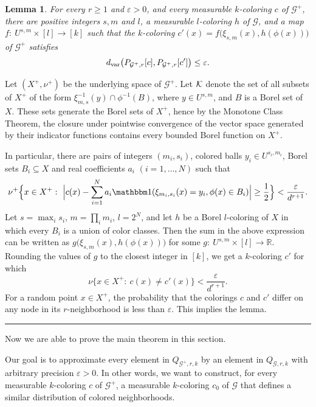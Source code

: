 \documentclass{article}
\newtheorem{lemma}[theorem]{Lemma}
\newenvironment{proof}{{\bf Proof.}}{\hfill\rule{2mm}{2mm}\medskip}
\def\one{{\mathbbm1}}
\def\GG{\mathcal{G}}\def\HH{\mathcal{H}}\def\II{\mathcal{I}}
\def\eps{\varepsilon}
\begin{document}
\begin{lemma}\label{LEM:COLOR-APPROX}
For every $r\ge1$ and $\eps>0$, and every measurable $k$-coloring $c$
of $\GG^+$, there are positive integers $s,m$ and $l$, a measurable
$l$-coloring $h$ of $\GG$, and a map $f:~U^{s,m}\times[l]\to [k]$
such that the $k$-coloring $c'(x)= f\bigl(\xi_{s,m}(x),
h(\phi(x))\big)$ of $\GG^+$ satisfies
\[
d_{\rm var}\bigl(P_{\GG^+,r}[c],P_{\GG^+,r}[c']\bigr) \le \eps.
\]
\end{lemma}
%
\begin{proof}
Let $(X^+,\nu^+)$ be the underlying space of $\GG^+$. Let $\mathcal{K}$
denote the set of all subsets of $X^+$ of the form
$\xi_{m,s}^{-1}(y)\cap \phi^{-1}(B)$, where $y\in U^{s,m}$, and $B$
is a Borel set of $X$. These sets generate the Borel sets of $X^+$,
hence by the Monotone Class Theorem, the closure under pointwise
convergence of the vector space generated by their indicator
functions contains every bounded Borel function on $X^+$.

In particular, there are pairs of integers $(m_i,s_i)$, colored balls
$y_i\in U^{s_i,m_i}$, Borel sets $B_i\subseteq X$ and real
coefficients $a_i$ $(i=1,\dots,N)$ such that
\[
\nu^+\Bigl\{x\in X^+:~\Bigl|c(x)-\sum_{i=1}^N
a_i\one(\xi_{m_i,s_i}(x)=y_i, \phi(x)\in B_i)\Bigr|\ge\frac12\Bigr\}
< \frac{\eps}{d^{r+1}}.
\]
Let $s=\max_i s_i$, $m=\prod_i m_i$, $l=2^N$, and let $h$ be a Borel
$l$-coloring of $X$ in which every $B_i$ is a union of color
classes. Then the sum in the above expression can be written as
$g\bigl(\xi_{s,m}(x),h(\phi(x))\bigr)$ for some $g:~U^{s,m}\times[l]\to
\mathbb{R}$. Rounding the values of $g$ to
the closest integer in $[k]$, we get a $k$-coloring $c'$ for which
\[
\nu\bigl\{x\in X^+:~c(x)\not=c'(x)\bigr\} <\frac{\eps}{d^{r+1}}.
\]
For a random point $x\in X^+$, the probability that the colorings $c$
and $c'$ differ on any node in its $r$-neighborhood is less than
$\eps$. This implies the lemma.
\end{proof}

Now we are able to prove the main theorem in this section.

\medskip

 Our goal is to
approximate every element in $Q_{\GG^+,r,k}$ by an element in
$Q_{\GG,r,k}$ with arbitrary precision $\eps>0$. In other words, we
want to construct, for every measurable $k$-coloring $c$ of $\GG^+$,
a measurable $k$-coloring $c_0$ of $\GG$ that defines a similar
distribution of colored neighborhoods.
\end{document}
